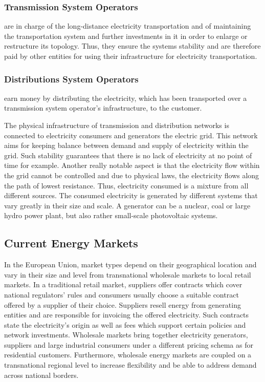 \documentclass[runningheads]{llncs}
\begin{document}
\subsubsection{Transmission System Operators} are in charge of the long-distance electricity transportation and of maintaining the transportation system and further investments in it in order to enlarge or restructure its topology. Thus, they ensure the systems stability and are therefore paid by other entities for using their infrastructure for electricity transportation.

\subsubsection{Distributions System Operators} earn money by distributing the electricity, which has been transported over a transmission system operator’s infrastructure, to the customer. \newline

The physical infrastructure of transmission and distribution networks is connected to electricity consumers and generators the electric grid. This network aims for keeping balance between demand and supply of electricity within the grid. Such stability guarantees that there is no lack of electricity at no point of time for example. Another really notable aspect is that the electricity flow within the grid cannot be controlled and due to physical laws, the electricity flows along the path of lowest resistance. Thus, electricity consumed is a mixture from all different sources.
The consumed electricity is generated by different systems that vary greatly in their size and scale. A generator can be a nuclear, coal or large hydro power plant, but also rather small-scale photovoltaic systems. \cite{eu_energy_market}

\subsection{Current Energy Markets}
In the European Union, market types depend on their geographical location and vary in their size and level from transnational wholesale markets to local retail markets. In a traditional retail market, suppliers offer contracts which cover national regulators’ rules and consumers usually choose a suitable contract offered by a supplier of their choice. Suppliers resell energy from generating entities and are responsible for invoicing the offered electricity. Such contracts state the electricity’s origin as well as fees which support certain policies and network investments.
Wholesale markets bring together electricity generators, suppliers and large industrial consumers under a different pricing schema as for residential customers. Furthermore, wholesale energy markets are coupled on a transnational regional level to increase flexibility and be able to address demand across national borders.\cite{eu_energy_market}
\end{document}
